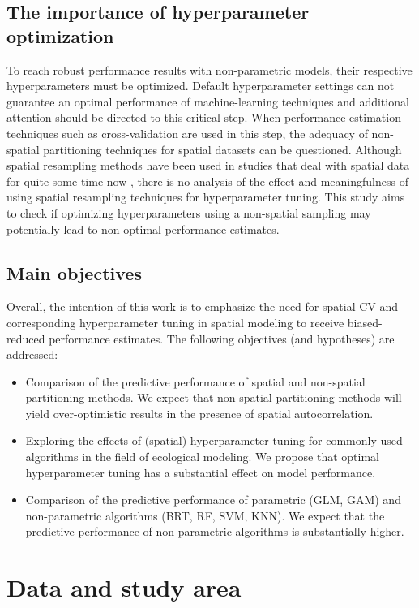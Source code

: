 \documentclass[review]{elsarticle}
\begin{document}
\subsection{The importance of hyperparameter optimization}
\label{subsec:importance_of_tuning}
To reach robust performance results with non-parametric models, their respective hyperparameters must be optimized.
Default hyperparameter settings can not guarantee an optimal performance of machine-learning techniques and additional attention should be directed to this critical step.
When performance estimation techniques such as cross-validation are used in this step, the adequacy of non-spatial partitioning techniques for spatial datasets can be questioned.
Although spatial resampling methods have been used in studies that deal with spatial data for quite some time now \citep{Geiss2017, Iturritxa2014, Meyer2018}, there is no analysis of the effect and meaningfulness of using spatial resampling techniques for hyperparameter tuning.
This study aims to check if optimizing hyperparameters using a non-spatial sampling may potentially lead to non-optimal performance estimates.

\subsection{Main objectives}
Overall, the intention of this work is to emphasize the need for spatial \ac{CV} and corresponding hyperparameter tuning in spatial modeling to receive biased-reduced performance estimates.
The following objectives (and hypotheses) are addressed:

\begin{itemize}
	\item Comparison of the predictive performance of spatial and non-spatial partitioning methods. We expect that non-spatial partitioning methods will yield over-optimistic results in the presence of spatial autocorrelation.
	\item Exploring the effects of (spatial) hyperparameter tuning for commonly used algorithms in the field of ecological modeling. We propose that optimal hyperparameter tuning has a substantial effect on model performance.
	\item Comparison of the predictive performance of parametric (GLM, GAM) and non-parametric algorithms (BRT, RF, SVM, KNN). We expect that the predictive performance of non-parametric algorithms is substantially higher.
\end{itemize}

\section{Data and study area}
\end{document}
